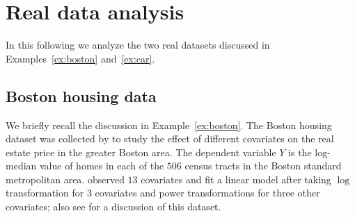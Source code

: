 {\section{Real data analysis} %
\label{sec:real_data_analysis}


In this following we analyze the two real datasets discussed in Examples~\ref{ex:boston} and~\ref{ex:car}.

\subsection{Boston housing data}\label{sec:boston}


We briefly recall the discussion in Example~\ref{ex:boston}. The Boston housing dataset was collected by \cite{harrison1978hedonic} to study the effect of different covariates on the real estate price in the greater Boston area. The dependent variable $Y$ is the  log-median value of homes in each of the $506$ census tracts in the Boston standard metropolitan area. \citet{harrison1978hedonic} observed $13$ covariates and fit a linear model after taking $\log$ transformation for $3$ covariates and power transformations for three other covariates; also see \cite{MR2589322} for a discussion of this dataset.


}
